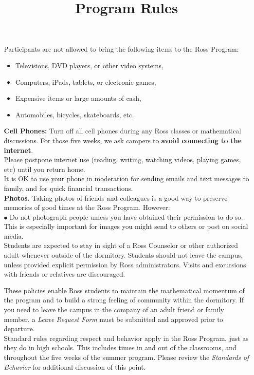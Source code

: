\documentclass{rossasia}
\title{Program Rules}
\begin{document}
\maketitle

Participants are not allowed to bring the following items to the Ross
Program:
\begin{itemize}[topsep=0pt]
\item Televisions, DVD players, or other video systems,
\item Computers, iPads, tablets, or electronic games,
\item Expensive items or large amounts of cash,
\item Automobiles, bicycles, skateboards, etc.
\end{itemize}


\textbf{Cell Phones:} Turn off all cell phones 
during any Ross classes or mathematical discussions.  For those five weeks, 
we ask campers to {\bf avoid connecting to the internet}. \\
Please postpone internet use (reading, writing, watching videos,
playing games, etc) until you return home. \\
It is OK to use your phone in moderation for sending emails
and text messages to family, and for quick financial transactions.\\

{\bf Photos.} Taking photos of friends and colleagues is a good way to 
preserve memories of good times at the Ross Program.  However:  \\[3pt]
\hspace*{8mm}$\bullet$ Do not photograph people unless you have obtained their permission to do so. \\[3pt]
This is especially important for images you might send to others or post on social media.\\

Students are expected to stay in sight of a Ross Counselor or other authorized adult 
whenever outside of the dormitory. Students should not leave the campus,
unless provided explicit permission by Ross administrators.  
Visits and excursions with friends or
relatives are discouraged.  

These policies enable Ross students to maintain
the mathematical momentum of the program and to build a strong feeling of community
within the dormitory.  If you need to leave the campus in the company
of an adult friend or family member, a {\it Leave Request Form} must be submitted
and approved prior to departure.\\

Standard rules regarding respect and behavior apply in the Ross
Program, just as they do in high schools. This includes times in and
out of the classrooms, and throughout the five weeks of the summer
program. Please review the \textit{Standards of Behavior} for
additional discussion of this point.
\end{document}
